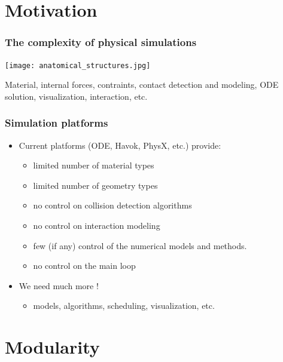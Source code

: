 \documentclass[a4paper,compress]{beamer}
\begin{document}

\section{Motivation}

\begin{frame}
\frametitle{The complexity of physical simulations}
\begin{center}
 \texttt{[image: anatomical\_structures.jpg]}
\end{center}
Material, internal forces, contraints, contact detection and modeling, ODE solution, visualization, interaction, etc.
\end{frame}

\begin{frame}
\frametitle{Simulation platforms}
\begin{itemize}
\item Current platforms (ODE, Havok, PhysX, etc.) provide:
\begin{itemize}
\item limited number of material types
\item limited number of geometry types
\item no control on collision detection algorithms
\item no control on interaction modeling
\item few (if any) control of the numerical models and methods.
\item no control on the main loop
\end{itemize}
\item We need much more !
\begin{itemize}
 \item models, algorithms, scheduling, visualization, etc.
\end{itemize}

\end{itemize}
\end{frame}




\section{Modularity}
\end{document}
